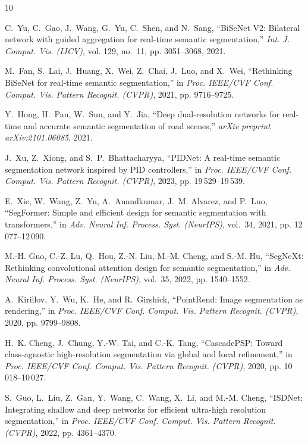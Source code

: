 \documentclass[11pt,a4paper]{article}
\begin{document}

\begin{thebibliography}{10}

C.~Yu, C.~Gao, J.~Wang, G.~Yu, C.~Shen, and N.~Sang, ``BiSeNet V2: Bilateral network with guided aggregation for real-time semantic segmentation,'' \emph{Int. J. Comput. Vis. (IJCV)}, vol. 129, no.~11, pp. 3051--3068, 2021.

M.~Fan, S.~Lai, J.~Huang, X.~Wei, Z.~Chai, J.~Luo, and X.~Wei, ``Rethinking BiSeNet for real-time semantic segmentation,'' in \emph{Proc. IEEE/CVF Conf. Comput. Vis. Pattern Recognit. (CVPR)}, 2021, pp. 9716--9725.

Y.~Hong, H.~Pan, W.~Sun, and Y.~Jia, ``Deep dual-resolution networks for real-time and accurate semantic segmentation of road scenes,'' \emph{arXiv preprint arXiv:2101.06085}, 2021.

J.~Xu, Z.~Xiong, and S.~P.~Bhattacharyya, ``PIDNet: A real-time semantic segmentation network inspired by PID controllers,'' in \emph{Proc. IEEE/CVF Conf. Comput. Vis. Pattern Recognit. (CVPR)}, 2023, pp. 19\,529--19\,539.

E.~Xie, W.~Wang, Z.~Yu, A.~Anandkumar, J.~M. Alvarez, and P.~Luo, ``SegFormer: Simple and efficient design for semantic segmentation with transformers,'' in \emph{Adv. Neural Inf. Process. Syst. (NeurIPS)}, vol.~34, 2021, pp. 12\,077--12\,090.

M.-H. Guo, C.-Z. Lu, Q.~Hou, Z.-N. Liu, M.-M. Cheng, and S.-M. Hu, ``SegNeXt: Rethinking convolutional attention design for semantic segmentation,'' in \emph{Adv. Neural Inf. Process. Syst. (NeurIPS)}, vol.~35, 2022, pp. 1540--1552.

A.~Kirillov, Y.~Wu, K.~He, and R.~Girshick, ``PointRend: Image segmentation as rendering,'' in \emph{Proc. IEEE/CVF Conf. Comput. Vis. Pattern Recognit. (CVPR)}, 2020, pp. 9799--9808.

H.~K. Cheng, J.~Chung, Y.-W. Tai, and C.-K. Tang, ``CascadePSP: Toward class-agnostic high-resolution segmentation via global and local refinement,'' in \emph{Proc. IEEE/CVF Conf. Comput. Vis. Pattern Recognit. (CVPR)}, 2020, pp. 10\,018--10\,027.

S.~Guo, L.~Liu, Z.~Gan, Y.~Wang, C.~Wang, X.~Li, and M.-M. Cheng, ``ISDNet: Integrating shallow and deep networks for efficient ultra-high resolution segmentation,'' in \emph{Proc. IEEE/CVF Conf. Comput. Vis. Pattern Recognit. (CVPR)}, 2022, pp. 4361--4370.


\end{thebibliography}
\end{document}
